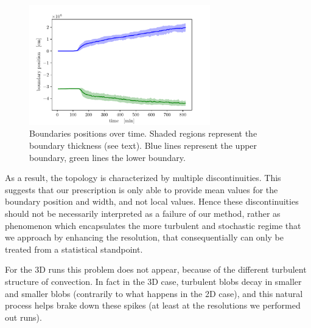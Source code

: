 \begin{figure}[b!]
\centering
\includegraphics[width=0.7\textwidth]{./img/boundpos.pdf}
\caption{Boundaries positions over time. Shaded regions represent the boundary thickness (see text). Blue lines represent the upper boundary, green lines the lower boundary.}
\label{fig:boundpos}
\end{figure}
As a result, the topology is characterized by multiple discontinuities. This suggests that our prescription is only able to provide mean values for the boundary position and width, and not local values. Hence these discontinuities should not be necessarily interpreted as a failure of our method, rather as phenomenon which encapsulates the more turbulent and stochastic regime that we approach by enhancing the resolution, that consequentially can only be treated from a statistical standpoint.

For the 3D runs this problem does not appear, because of the different turbulent structure of convection. In fact in the 3D case, turbulent blobs decay in smaller and smaller blobs (contrarily to what happens in the 2D case), and this natural process helps brake down these spikes (at least at the resolutions we performed out runs).


